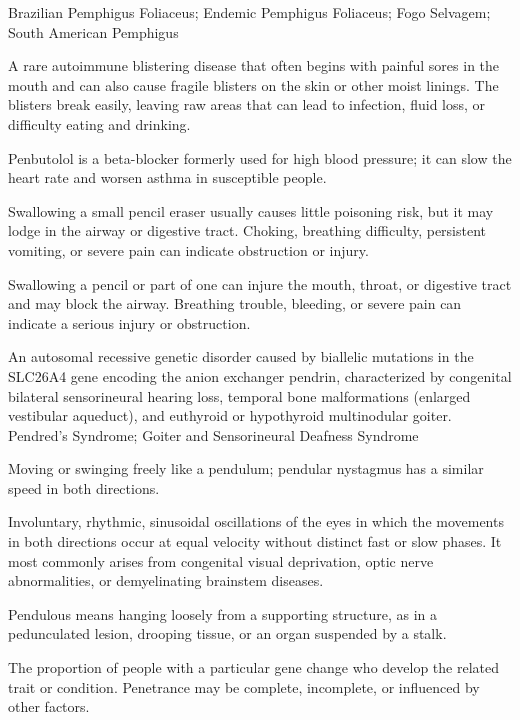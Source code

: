 \synonyms
Brazilian Pemphigus Foliaceus; Endemic Pemphigus Foliaceus; Fogo Selvagem; South American Pemphigus

 A rare autoimmune blistering disease that often begins with painful sores in the mouth and can also cause fragile blisters on the skin or other moist linings. The blisters break easily, leaving raw areas that can lead to infection, fluid loss, or difficulty eating and drinking.

 Penbutolol is a beta-blocker formerly used for high blood pressure; it can slow the heart rate and worsen asthma in susceptible people.

 Swallowing a small pencil eraser usually causes little poisoning risk, but it may lodge in the airway or digestive tract. Choking, breathing difficulty, persistent vomiting, or severe pain can indicate obstruction or injury.

 Swallowing a pencil or part of one can injure the mouth, throat, or digestive tract and may block the airway. Breathing trouble, bleeding, or severe pain can indicate a serious injury or obstruction.

 An autosomal recessive genetic disorder caused by biallelic mutations in the SLC26A4 gene encoding the anion exchanger pendrin, characterized by congenital bilateral sensorineural hearing loss, temporal bone malformations (enlarged vestibular aqueduct), and euthyroid or hypothyroid multinodular goiter.
\synonyms
Pendred's Syndrome; Goiter and Sensorineural Deafness Syndrome

 Moving or swinging freely like a pendulum; pendular nystagmus has a similar speed in both directions.

 Involuntary, rhythmic, sinusoidal oscillations of the eyes in which the movements in both directions occur at equal velocity without distinct fast or slow phases. It most commonly arises from congenital visual deprivation, optic nerve abnormalities, or demyelinating brainstem diseases.

 Pendulous means hanging loosely from a supporting structure, as in a pedunculated lesion, drooping tissue, or an organ suspended by a stalk.

 The proportion of people with a particular gene change who develop the related trait or condition. Penetrance may be complete, incomplete, or influenced by other factors.

